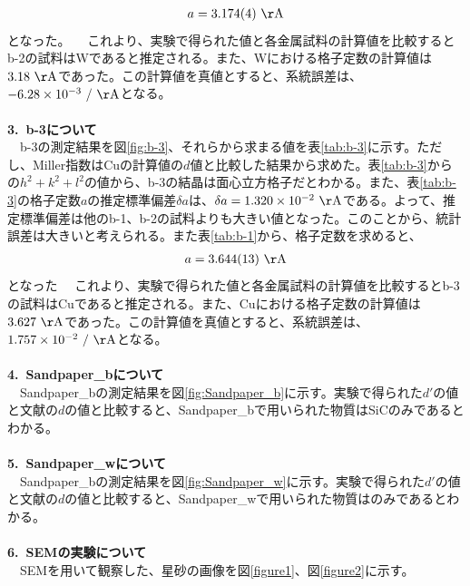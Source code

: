 \documentclass[a4paper,10.5pt]{ltjsarticle}
\begin{document}
\begin{align}
  a=3.174(4)\ \mathrm{\AA}
\end{align}
となった。
　これより、実験で得られた値と各金属試料の計算値を比較するとb-2の試料はWであると推定される。また、Wにおける格子定数の計算値は$3.18\ \mathrm{\AA}$であった。この計算値を真値とすると、系統誤差は、$-6.28\times10^{-3}\ /\ \mathrm{\AA}$となる。\\
\\
{\large \bfseries 3.\ b-3について}\\
　b-3の測定結果を図\ref{fig:b-3}、それらから求まる値を表\ref{tab:b-3}に示す。ただし、Miller指数はCuの計算値の$d$値と比較した結果から求めた。表\ref{tab:b-3}からの$h^2+k^2+l^2$の値から、b-3の結晶は面心立方格子だとわかる。また、表\ref{tab:b-3}の格子定数$a$の推定標準偏差$\delta a$は、$\delta a=1.320\times10^{-2}\ \mathrm{\AA}$である。よって、推定標準偏差は他のb-1、b-2の試料よりも大きい値となった。このことから、統計誤差は大きいと考えられる。また表\ref{tab:b-1}から、格子定数を求めると、
\begin{align}
  a=3.644(13)\ \mathrm{\AA}
\end{align}
となった
　これより、実験で得られた値と各金属試料の計算値を比較するとb-3の試料はCuであると推定される。また、Cuにおける格子定数の計算値は$3.627\ \mathrm{\AA}$であった。この計算値を真値とすると、系統誤差は、$1.757\times10^{-2}\ /\ \mathrm{\AA}$となる。\\
\\
{\large \bfseries 4.\ Sandpaper\_bについて}\\
　Sandpaper\_bの測定結果を図\ref{fig:Sandpaper_b}に示す。実験で得られた$d'$の値と文献\cite{text1}の$d$の値と比較すると、Sandpaper\_bで用いられた物質はSiCのみであるとわかる。\\
\\
{\large \bfseries 5.\ Sandpaper\_wについて}\\
　Sandpaper\_bの測定結果を図\ref{fig:Sandpaper_w}に示す。実験で得られた$d'$の値と文献\cite{text1}の$d$の値と比較すると、Sandpaper\_wで用いられた物質はのみであるとわかる。\\
\\
{\large \bfseries 6.\ SEMの実験について}\\
　SEMを用いて観察した、星砂の画像を図\ref{figure1}、図\ref{figure2}に示す。
\end{document}
